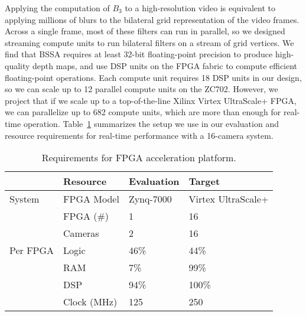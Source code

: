Applying the computation of $B_3$ to a high-resolution video is equivalent to applying millions of blurs to the bilateral grid representation of the video frames. Across a single frame, most of these filters can run in parallel, so we designed streaming compute units to run bilateral filters on a stream of grid vertices. We find that BSSA requires at least 32-bit floating-point precision to produce high-quality depth maps, and use DSP units on the FPGA fabric to compute efficient floating-point operations. Each compute unit requires 18 DSP units in our design, so we can scale up to 12 parallel compute units on the ZC702. However, we project that if we scale up to a top-of-the-line Xilinx Virtex UltraScale+ FPGA, we can parallelize up to 682 compute units, which are more than enough for real-time operation. Table~\ref{table:vr-resources} summarizes the setup we use in our evaluation and resource requirements for real-time performance with a 16-camera system.

\begin{table}[h]
  \centering
\caption{Requirements for FPGA acceleration platform.}
  \begin{tabular}{ l @{\hskip 6pt}l @{\hskip 6pt}l @{\hskip 6pt}l  }
\toprule
 & {Resource} & {Evaluation} & {Target} \\
\midrule
System   & FPGA Model       & Zynq-7000 & Virtex UltraScale+ \\
         & FPGA (\#)        & 1                 & 16                       \\
         & Cameras          & 2                 & 16                       \\
\midrule
Per FPGA & Logic            & 46\%           & 44\%                  \\
         & RAM              & 7\%            & 99\%                  \\
         & DSP              & 94\%           & 100\%                  \\
         & Clock (MHz)      & 125               & 250       \\
\bottomrule
\end{tabular}


\label{table:vr-resources}
\end{table}

